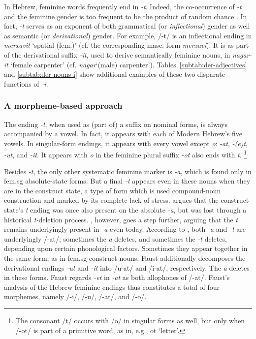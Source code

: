 In Hebrew, feminine words frequently 
end in \textit{-t}. Indeed, the co-occurrence of \textit{-t} and the feminine gender is 
too frequent to be the product of random chance \citep{faust:2013}.
In fact, \textit{-t} serves as an exponent of both grammatical (or \emph{inflectional}) 
gender as well as semantic (or \emph{derivational}) gender. For example, /-t/ 
is an inflectional ending in \textit{merxavit} `spatial (fem.)' 
(cf. the corresponding masc. form \textit{merxavi}). 
It is as part of the derivational suffix \textit{-it}, used to 
derive semantically feminine nouns, in \textit{nagar-it} 
`female carpenter' (cf. \textit{nagar}`(male) carpenter'). 
Tables~\ref{subtab:der-adjectives} and \ref{subtab:der-nouns-i} 
show additional
examples of these two disparate functions of \textit{-i}.

\subsubsection{A morpheme-based approach}
The ending \textit{-t}, when used as (part of) a suffix on 
nominal forms, is always accompanied by a vowel. 
In fact, it appears with each of Modern Hebrew's five vowels.
In singular-form endings, it appears with every vowel except 
\textit{o}: \textit{-at}, \textit{-(e)t}, \textit{-ut}, and \textit{-it}. 
It appears with \textit{o} in the feminine plural suffix \textit{-ot} 
also ends with \textit{t}. \footnote{The consonant /t/ occurs with 
/o/ in singular forms as well, but only when /-ot/ is part of a 
primitive word, as in, e.g., ot `letter'.}

Besides \textit{-t}, the only other systematic feminine marker is 
\textit{-a}, which is found only 
in fem.sg absolute-state forms. %
But a final \textit{-t} appears even in these nouns when they are 
in the construct state, a type of form which is used compound-noun 
construction and marked by its complete lack of stress.
\cite{schwarzwald:1982} argues that
the construct-state's \textit{t} ending was once also 
present on the absolute \textit{-a}, but was lost through a historical
\textit{t-}deletion process. \cite{faust:2013}, however, 
goes a step further, arguing that the \textit{t} remains 
underlyingly present in \textit{-a} even today. According 
to \cite{faust:2013}, both
\textit{-a} and \textit{-t} are underlyingly /-at/; sometimes 
the \textit{a} deletes, and sometimes the \textit{-t} deletes, depending 
upon certain phonological factors. Sometimes they appear 
together in the same form, as in fem.sg construct nouns.
 Faust additionally decomposes the derivational endings 
\textit{-ut} and \textit{-it} into /u-at/ and /i-at/, respectively. 
The \textit{a} deletes in these forms.
Faust regards \textit{-et} in \textit{-at} as both allophones of /-at/. 
Faust's analysis of the Hebrew feminine endings thus constitutes a total of 
four morphemes, namely /-i/, /-u/, /-at/, and /-o/.
  
